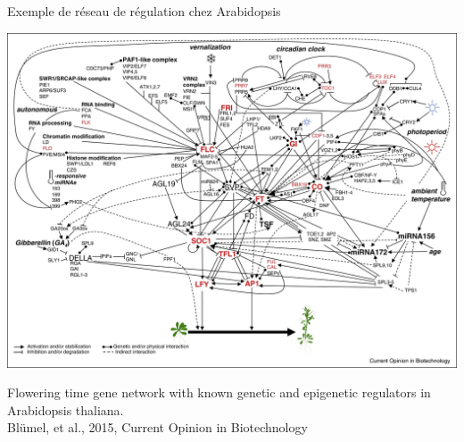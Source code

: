 \begin{frame}{Exemple de réseau de régulation chez Arabidopsis}
\begin{center}
    \includegraphics[scale = 0.45]{Figures/Intro/flowering-network-in-arabidopsis.jpeg}
 \end{center}
 
\begin{tiny}
    Flowering time gene network with known genetic and epigenetic regulators in Arabidopsis thaliana.\\
    Blümel, et al., 2015, Current Opinion in Biotechnology
    \end{tiny}
\end{frame}

	
	
